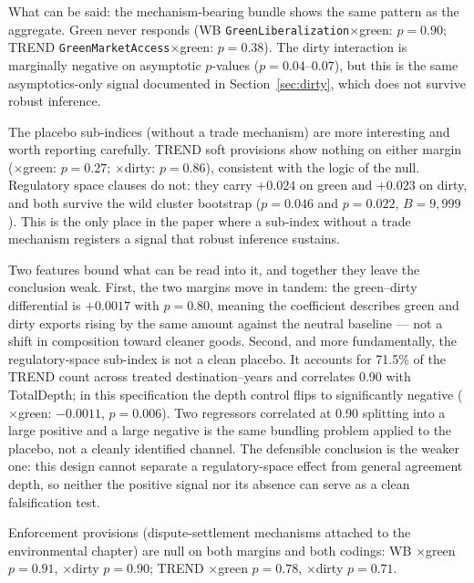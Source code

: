 \documentclass[12pt]{article}
\begin{document}
What can be said: the mechanism-bearing bundle shows the same pattern as the aggregate.
Green never responds (WB \texttt{GreenLiberalization}$\times$green: $p = 0.90$; TREND
\texttt{GreenMarketAccess}$\times$green: $p = 0.38$). The dirty interaction is marginally
negative on asymptotic $p$-values ($p = 0.04$--$0.07$), but this is the same
asymptotics-only signal documented in Section~\ref{sec:dirty}, which does not survive
robust inference.

The placebo sub-indices (without a trade mechanism) are more interesting and worth
reporting carefully. TREND soft provisions show nothing on either margin ($\times$green:
$p = 0.27$; $\times$dirty: $p = 0.86$), consistent with the logic of the null. Regulatory
space clauses do not: they carry $+0.024$ on green and $+0.023$ on dirty, and both survive
the wild cluster bootstrap ($p = 0.046$ and $p = 0.022$, $B = 9{,}999$). This is the only
place in the paper where a sub-index without a trade mechanism registers a signal that
robust inference sustains.

Two features bound what can be read into it, and together they leave the conclusion weak.
First, the two margins move in tandem: the green--dirty differential is $+0.0017$ with
$p = 0.80$, meaning the coefficient describes green and dirty exports rising by the same
amount against the neutral baseline --- not a shift in composition toward cleaner goods.
Second, and more fundamentally, the regulatory-space sub-index is not a clean placebo.
It accounts for 71.5\% of the TREND count across treated destination--years and
correlates 0.90 with TotalDepth; in this specification the depth control flips to
significantly negative ($\times$green: $-0.0011$, $p = 0.006$). Two regressors correlated
at 0.90 splitting into a large positive and a large negative is the same bundling problem
applied to the placebo, not a cleanly identified channel. The defensible conclusion is the
weaker one: this design cannot separate a regulatory-space effect from general agreement
depth, so neither the positive signal nor its absence can serve as a clean falsification
test.

Enforcement provisions (dispute-settlement mechanisms attached to the environmental
chapter) are null on both margins and both codings: WB $\times$green $p = 0.91$, $\times$dirty
$p = 0.90$; TREND $\times$green $p = 0.78$, $\times$dirty $p = 0.71$.
\end{document}
